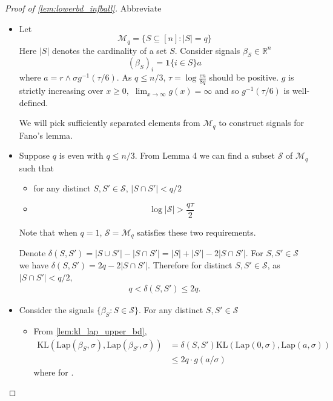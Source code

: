 \documentclass[ejs,noshowframe]{imsart}
\theoremstyle{plain}
\theoremstyle{definition}
\newcommand{\R}{\mathbb{R}}
\newcommand{\cM}{\mathcal{M}}
\newcommand{\cS}{\mathcal{S}}
\newcommand{\one}{\mathbf{1}}
\newcommand{\lap}{\mathrm{Lap}}
\newcommand{\kl}{\mathrm{KL}}
\begin{document}
\begin{appendix}
\begin{proof}[Proof of \autoref{lem:lowerbd_infball}]
	Abbreviate 
	\begin{itemize}
		\item Let $$\cM_{q} = \{ S \subseteq [n] : |S| = q\}$$ 
		Here $|S|$ denotes the cardinality of a set $S.$
		Consider signals $\beta_S \in \R^n$
		$$ (\beta_S)_i = \one \{i\in S\} a $$
		where $a = r \wedge \sigma g^{-1}(\tau /6).$
		As $q\leq n/3$, $\tau = \log \frac{en}{8q}$ should be positive. $g$ is 
		strictly 
		increasing over $x\geq 0,$ $\lim_{x\rightarrow \infty} g(x) = \infty$ and 
		so 
		$g^{-1}(\tau /6)$ is well-defined.
		
		We will pick sufficiently separated elements from $\cM_q$ to construct 
		signals 
		for  Fano's lemma.
		
		\item Suppose $q$ is even with $q\leq n/3$. From Lemma 4 
		\cite{birge2001gaussian} we can find a subset $\cS$ of $\cM_q$ such that  
		\begin{itemize}
			\item for any distinct $S,S' \in \cS$, $|S\cap S'| < q/2$
			\item  \begin{equation}
				\label{eq:packing_set_size}
				\log | \cS | >  \frac{q\tau }{2}
			\end{equation}
		\end{itemize}
		Note that when $q=1$, $\cS = \cM_q$ satisfies these two requirements.
		
		Denote $\delta(S,S') = |S\cup S'| - |S\cap S'| = |S|+|S'| - 2 |S\cap S'|.$ 
		For 
		$S,S' \in \cS$ we have $\delta(S,S')= 2q - 2 |S\cap S'|.$
		Therefore for distinct $S,S' \in \cS$, as $|S\cap S'| < q/2,$
		\begin{align} 
			\label{eq:delta_bd}
			q < \delta(S,S') \leq 2q.
		\end{align}
		\item Consider the signals $\{ \beta_S : S \in \cS \}.$ 
		For any distinct $S,S'\in \cS$
		\begin{itemize}
			\item 
			
			
			From \autoref{lem:kl_lap_upper_bd},
			\begin{align}
				\kl (\lap(\beta_S, \sigma), \lap(\beta_{S'},\sigma)) 
				&= \delta(S, S') \kl (\lap(0, \sigma), \lap(a,\sigma))\\ 
				\label{eq:fano_kl_bd}
				&\leq 2q \cdot g(a/\sigma)
			\end{align}
			where  for .
			

\end{itemize}
\end{itemize}
\end{proof}
\end{appendix}
\end{document}
